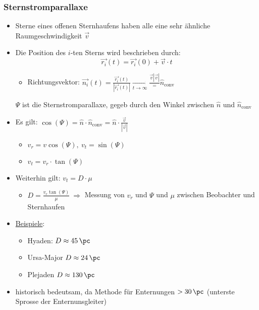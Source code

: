 \subsubsection{Sternstromparallaxe}
\begin{itemize}
	\item Sterne eines offenen Sternhaufens haben alle eine sehr ähnliche Raumgeschwindigkeit $\vec{v}$
	\item Die Position des $i$-ten Sterns wird beschrieben durch:
		\begin{equation*}
			\vec{r_i}(t)=\vec{r_i}(0)+\vec{v}\cdot t
		\end{equation*}
		\begin{itemize}
			\item Richtungsvektor: $\vec{n_i}(t)=\frac{\vec{r_i}(t)}{\left|\vec{r_i}(t)\right|} \underset{t\to\infty}{\to} \frac{\vec{v}{\left|\vec{v}\right|}}=\hat{n}_\text{conv}$
		\end{itemize}
		\begin{figure}[H]
		\end{figure}
		$\Psi$ ist die Sternstromparallaxe, gegeb durch den Winkel zwischen $\hat{n}$ und $\hat{n}_\text{conv}$
	\item Es gilt: $\cos(\Psi)=\hat{n}\cdot\hat{n}_\text{conv}=\hat{n}\cdot\frac{\vec{v}}{|\vec{v}|}$
		\begin{itemize}
			\item $v_r=v\cos(\Psi),\ v_t=\sin(\Psi)$
			\item $v_t=v_r\cdot\tan(\Psi)$
		\end{itemize}
	\item Weiterhin gilt: $v_t=D\cdot\mu$
		\begin{itemize}
			\item $D=\frac{v_r\tan(\Psi)}{\mu}\ \Rightarrow$ Messung von $v_r$ und $\Psi$ und $\mu$ zwischen Beobachter und Sternhaufen
		\end{itemize}
	\item \underline{Beispiele}:
		\begin{itemize}[label={}]
			\item Hyaden: $D\approx \SI{45}{\pc}$
			\item Ursa-Major $D\approx \SI{24}{\pc}$
			\item Plejaden $D\approx \SI{130}{\pc}$
		\end{itemize}
	\item historisch bedeutsam, da Methode für Enternungen $>\SI{30}{\pc}$ (unterste Sprosse der Enternunsgleiter)
\end{itemize}
